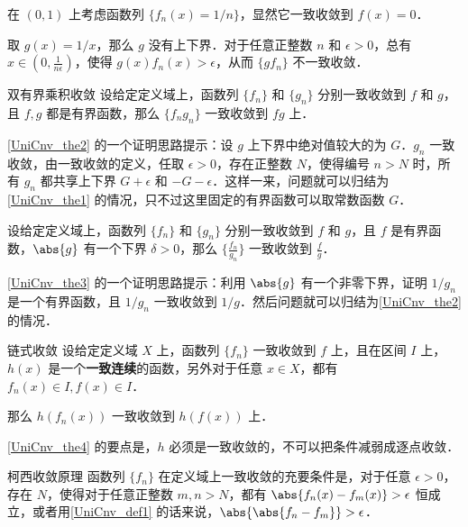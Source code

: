 \begin{example}{}\label{UniCnv_ex3}
在 $(0, 1)$ 上考虑函数列 $\{f_n(x)=1/n\}$，显然它一致收敛到 $f(x)=0$．

取 $g(x)=1/x$，那么 $g$ 没有上下界．对于任意正整数 $n$ 和 $\epsilon>0$，总有 $x\in(0, \frac{1}{n\epsilon})$，使得 $g(x)f_n(x)>\epsilon$，从而 $\{gf_n\}$ 不一致收敛．
\end{example}

\begin{theorem}{双有界乘积收敛}\label{UniCnv_the2}
设给定定义域上，函数列 $\{f_n\}$ 和 $\{g_n\}$ 分别一致收敛到 $f$ 和 $g$，且 $f, g$ 都是有界函数，那么 $\{f_ng_n\}$ 一致收敛到 $fg$ 上．
\end{theorem}

\autoref{UniCnv_the2} 的一个证明思路提示：设 $g$ 上下界中绝对值较大的为 $G$．$g_n$ 一致收敛，由一致收敛的定义，任取 $\epsilon>0$，存在正整数 $N$，使得编号 $n>N$ 时，所有 $g_n$ 都共享上下界 $G+\epsilon$ 和 $-G-\epsilon$．这样一来，问题就可以归结为\autoref{UniCnv_the1} 的情况，只不过这里固定的有界函数可以取常数函数 $G$．

\begin{theorem}{}\label{UniCnv_the3}
设给定定义域上，函数列 $\{f_n\}$ 和 $\{g_n\}$ 分别一致收敛到 $f$ 和 $g$，且 $f$ 是有界函数，$\abs{g}$ 有一个下界 $\delta>0$，那么 $\{\frac{f_n}{g_n}\}$ 一致收敛到 $\frac{f}{g}$．
\end{theorem}

\autoref{UniCnv_the3} 的一个证明思路提示：利用 $\abs{g}$ 有一个非零下界，证明 $1/g_n$ 是一个有界函数，且 $1/g_n$ 一致收敛到 $1/g$．然后问题就可以归结为\autoref{UniCnv_the2} 的情况．

\begin{theorem}{链式收敛}\label{UniCnv_the4}
设给定定义域 $X$ 上，函数列 $\{f_n\}$ 一致收敛到 $f$ 上，且在区间 $I$ 上，$h(x)$ 是一个\textbf{一致连续}的函数，另外对于任意 $x\in X$，都有 $f_n(x)\in I, f(x)\in I$．

那么 $h(f_n(x))$ 一致收敛到 $h(f(x))$ 上．
\end{theorem}

\autoref{UniCnv_the4} 的要点是，$h$ 必须是一致收敛的，不可以把条件减弱成逐点收敛．

\begin{theorem}{柯西收敛原理}\label{UniCnv_the6}
函数列 $\{f_n\}$ 在定义域上一致收敛的充要条件是，对于任意 $\epsilon>0$，存在 $N$，使得对于任意正整数 $m, n>N$，都有 $\abs{f_n(x)-f_m(x)}>\epsilon$ 恒成立，或者用\autoref{UniCnv_def1} 的话来说，$\abs{\abs{f_n-f_m}}>\epsilon$．
\end{theorem}

